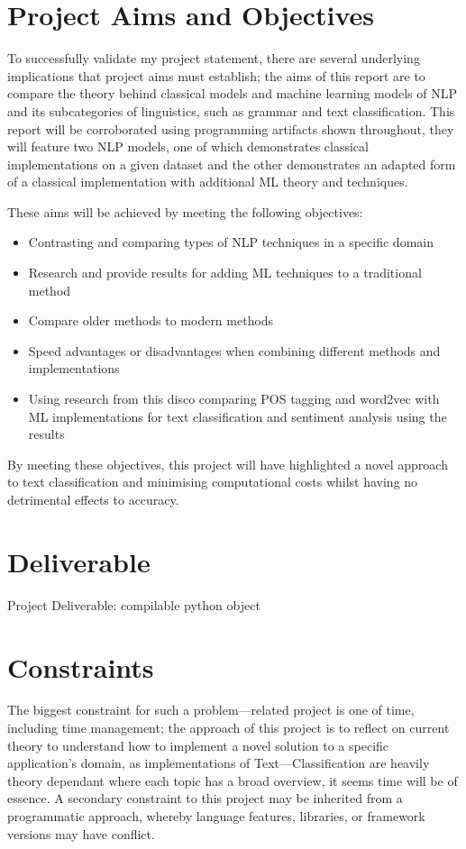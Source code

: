 \section{Project Aims and Objectives}

To successfully validate my project statement, there are several underlying implications that project aims must establish; the aims of this report are to compare the theory behind classical models and machine learning models of NLP and its subcategories of linguistics, such as grammar and text classification. This report will be corroborated using programming artifacts shown throughout, they will feature two NLP models, one of which demonstrates classical implementations on a given dataset and the other demonstrates an adapted form of a classical implementation with additional ML theory and techniques.

These aims will be achieved by meeting the following objectives:

\begin{itemize}
    \item Contrasting and comparing types of NLP techniques in a specific domain
    \item Research and provide results for adding ML techniques to a traditional method
	\item Compare older methods to modern methods
	\item Speed advantages or disadvantages when combining different methods and implementations
	\item Using research from this disco comparing POS tagging and word2vec with ML implementations for text classification and sentiment analysis using the results
\end{itemize}

By meeting these objectives, this project will have highlighted a novel approach to text classification and minimising computational costs whilst having no detrimental effects to accuracy.

\section{Deliverable}

Project Deliverable: compilable python object

\section{Constraints}

The biggest constraint for such a problem---related project is one of time, including time management; the approach of this project is to reflect on current theory to understand how to implement a novel solution to a specific application’s domain, as implementations of Text---Classification are heavily theory dependant where each topic has a broad overview, it seems time will be of essence. A secondary constraint to this project may be inherited from a programmatic approach, whereby language features, libraries, or framework versions may have conflict.


